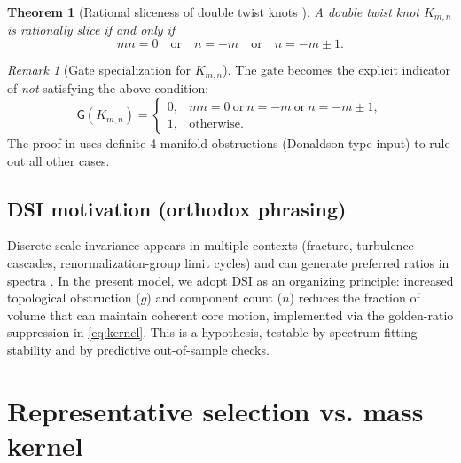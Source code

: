 \documentclass[11pt]{article}
\newcommand{\Gate}{\mathsf{G}}                 %
\newcommand{\Kmn}[2]{K_{#1,#2}}                %
\theoremstyle{definition}
\theoremstyle{plain}
\newtheorem{theorem}{Theorem}[section]
\theoremstyle{remark}
\newtheorem{remark}{Remark}[section]
\begin{document}
            \begin{theorem}[Rational sliceness of double twist knots \cite{Lee2025DoubleTwist}]
                A double twist knot \(\Kmn{m}{n}\) is rationally slice if and only if
                \[
                    mn=0
                    \quad\text{or}\quad
                    n=-m
                    \quad\text{or}\quad
                    n=-m\pm 1.
                \]
            \end{theorem}

            \begin{remark}[Gate specialization for \(\Kmn{m}{n}\)]
                The gate becomes the explicit indicator of \emph{not} satisfying the above condition:
                \[
                    \Gate(\Kmn{m}{n})=
                    \begin{cases}
                        0,& mn=0\ \text{or}\ n=-m\ \text{or}\ n=-m\pm 1,\\
                        1,& \text{otherwise}.
                    \end{cases}
                \]
                The proof in \cite{Lee2025DoubleTwist} uses definite 4-manifold obstructions (Donaldson-type input) to rule out all other cases. \cite{Donaldson1983}
            \end{remark}

        \subsection{DSI motivation (orthodox phrasing)}
        Discrete scale invariance appears in multiple contexts (fracture, turbulence cascades, renormalization-group limit cycles) and can generate preferred ratios in spectra \cite{Sornette1998}. In the present model, we adopt DSI as an organizing principle: increased topological obstruction ($g$) and component count ($n$) reduces the fraction of volume that can maintain coherent core motion, implemented via the golden-ratio suppression in \eqref{eq:kernel}. This is a hypothesis, testable by spectrum-fitting stability and by predictive out-of-sample checks.

        \section{Representative selection vs. mass kernel}
\end{document}
